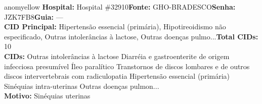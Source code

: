 \documentclass[a4paper,10pt]{article}
\begin{document}
\begin{anomalycard}[Interna\c{c}\~{a}o \#120341 | Pac. \#99763 | MODERADO (z=2.51) | LOS: 4d | 05/03/2026\,$\to$\,09/03/2026]{anomyellow}
\textbf{Hospital:} Hospital \#32910\quad \textbf{Fonte:} GHO-BRADESCO\quad \textbf{Senha:} JZK7FB8\quad \textbf{Guia:} ---\\

\textbf{CID Principal:} {\small Hipertensão essencial (primária), Hipotireoidismo não especificado, Outras intolerâncias à lactose, Outras doenças pulmo...}\quad\textbf{Total CIDs:} 10\\

\textbf{CIDs:} {\scriptsize Outras intolerâncias à lactose \textbar{} Diarréia e gastroenterite de origem infecciosa presumível \textbar{} Íleo paralítico \textbar{} Transtornos de discos lombares e de outros discos intervertebrais com radiculopatia \textbar{} Hipertensão essencial (primária) \textbar{} Sinéquias intra-uterinas \textbar{} Outras doenças pulmon...}\\

\textbf{Motivo:} {\scriptsize Sinéquias uterinas}\\




\end{anomalycard}
\end{document}
